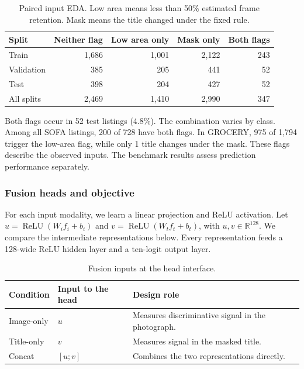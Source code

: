 \documentclass[final]{hcmut-report}
\begin{document}
\begin{table}[H]
\centering
\small
\caption{Paired input EDA. Low area means less than 50\% estimated frame retention. Mask means the title changed under the fixed rule.}
\label{tab:mod-paired}
\begin{tabular}{@{}lrrrr@{}}
\toprule
Split & Neither flag & Low area only & Mask only & Both flags\\ \midrule
Train & 1,686 & 1,001 & 2,122 & 243\\
Validation & 385 & 205 & 441 & 52\\
Test & 398 & 204 & 427 & 52\\
All splits & 2,469 & 1,410 & 2,990 & 347\\
\bottomrule
\end{tabular}
\end{table}

Both flags occur in 52 test listings (4.8\%). The combination varies by class. Among all SOFA listings, 200 of 728 have both flags. In GROCERY, 975 of 1,794 trigger the low-area flag, while only 1 title changes under the mask. These flags describe the observed inputs. The benchmark results assess prediction performance separately.

\subsubsection{Fusion heads and objective}
For each input modality, we learn a linear projection and ReLU activation. Let \(u=\operatorname{ReLU}(W_i f_i+b_i)\) and \(v=\operatorname{ReLU}(W_t f_t+b_t)\), with \(u,v\in\mathbb{R}^{128}\). We compare the intermediate representations below. Every representation feeds a 128-wide ReLU hidden layer and a ten-logit output layer.

\begin{table}[H]
\centering
\caption{Fusion inputs at the head interface.}
\begin{tabularx}{\linewidth}{@{}p{.24\linewidth}p{.23\linewidth}Y@{}}
\toprule
Condition & Input to the head & Design role\\ \midrule
Image-only & \(u\) & Measures discriminative signal in the photograph.\\
Title-only & \(v\) & Measures signal in the masked title.\\
Concat & \([u;v]\) & Combines the two representations directly.\\
\bottomrule
\end{tabularx}
\end{table}
\end{document}
